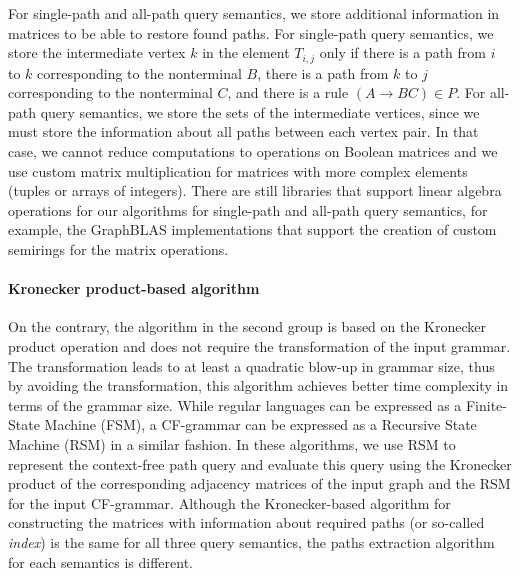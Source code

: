 \documentclass[sigconf, nonacm]{acmart}
\begin{document}
For single-path and all-path query semantics, we store additional information in matrices to be able to restore found paths. For single-path query semantics, we store the intermediate vertex $k$ in the element $T_{i,j}$ only if there is a path from $i$ to $k$ corresponding to the nonterminal $B$, there is a path from $k$ to $j$ corresponding to the nonterminal $C$, and there is a rule $(A \rightarrow B C) \in P$. For all-path query semantics, we store the sets of the intermediate vertices, since we must store the information about all paths between each vertex pair. In that case, we cannot reduce computations to operations on Boolean matrices and we use custom matrix multiplication for matrices with more complex elements (tuples or arrays of integers). There are still libraries that support linear algebra operations for our algorithms for single-path and all-path query semantics, for example, the GraphBLAS implementations that support the creation of custom semirings for the matrix operations.

\paragraph{Kronecker product-based algorithm}
On the contrary, the algorithm in the second group is based on the Kronecker product operation and does not require the transformation of the input grammar. The transformation leads to at least a quadratic blow-up in
grammar size, thus by avoiding the transformation, this algorithm achieves better time complexity in terms of the grammar size. While regular languages can be expressed as a Finite-State Machine (FSM), a CF-grammar can be expressed as a Recursive State Machine (RSM) in a similar
fashion. In these algorithms, we use RSM to represent the context-free path query and evaluate this query using the Kronecker product of the corresponding adjacency matrices of the input graph and the RSM for the input CF-grammar. Although the Kronecker-based algorithm for constructing the matrices with information about required paths (or so-called \textit{index}) is the same for all three query semantics, the paths extraction algorithm for each semantics is different.
\end{document}
